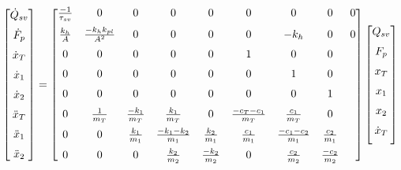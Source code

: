 \documentclass[  10pt, twoside]{report} %
\numberwithin{equation}{chapter}
\begin{document}
\begin{align}
    \hspace{-3mm}
    \begin{bmatrix} 
        \dot{Q}_{sv} \\[6pt]
        \dot{F}_p \\[6pt]
        \dot{x}_T \\[6pt]
        \dot{x}_1 \\[6pt]
        \dot{x}_2 \\[6pt]
        \ddot{x}_T \\[6pt]
        \ddot{x}_1 \\[6pt]
        \ddot{x}_2 
    \end{bmatrix} &=
    \begin{bmatrix}
    \frac{-1}{\tau_{sv}} &  0 & 0 & 0 & 0 & 0 & 0 & 0 & 0\\[6pt]
    \frac{k_h}{A}  & \frac{- k_h k_{pl}}{A^2} & 0              & 0 & 0                & 0   & -k_h & 0               & 0 \\[6pt]
                    0 &               0              & 0 & 0                & 0   & 1    & 0               & 0 \\[6pt]
                    0 &               0              & 0 & 0                & 0   & 0    & 1               & 0 \\[6pt]
                    0 &               0              & 0 & 0                & 0   & 0    & 0               & 1 \\[6pt]
                    0 &                \frac{1}{m_T} & \frac{-k_1}{m_T} & \frac{k_1}{m_T}     &  0              & \frac{-c_T - c_1 }{m_T} & \frac{ c_1 }{m_T}   & 0               \\[6pt]
                    0 &                0             & \frac{k_1}{m_1}  &\frac{-k_1-k_2}{m_1} & \frac{k_2}{m_1} & \frac{c_1}{m_1}         &\frac{-c_1-c_2}{m_1} & \frac{c_2}{m_1} \\[6pt]
                    0 &                0             &         0        & \frac{k_2}{m_2}     & \frac{-k_2}{m_2}& 0                       & \frac{c_2}{m_2}     & \frac{-c_2}{m_2}
    \end{bmatrix}             
    \begin{bmatrix}
        Q_{sv} \\[6pt]
        F_p \\[6pt]
        x_T \\[6pt]
        x_1 \\[6pt]
        x_2 \\[6pt]
        \dot{x}_T \\[6pt]

\end{bmatrix}
\end{align}
\end{document}
